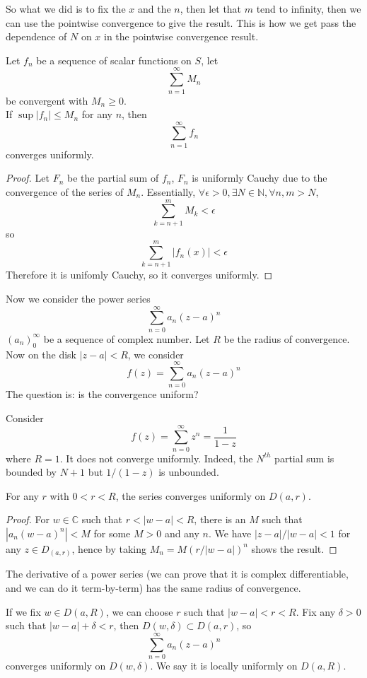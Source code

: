So what we did is to fix the $x$ and the $n$, then let that $m$ tend to infinity, then we can use the pointwise convergence to give the result.
This is how we get pass the dependence of $N$ on $x$ in the pointwise convergence result.
\begin{corollary}
    Let $f_n$ be a sequence of scalar functions on $S$, let
    $$\sum_{n=1}^\infty M_n$$
    be convergent with $M_n\ge 0$.\\
    If $\sup |f_n|\le M_n$ for any $n$, then
    $$\sum_{n=1}^\infty f_n$$
    converges uniformly.
\end{corollary}
\begin{proof}
    Let $F_n$ be the partial sum of $f_n$, $F_n$ is uniformly Cauchy due to the convergence of the series of $M_n$.
    Essentially, $\forall\epsilon>0,\exists N\in\mathbb N,\forall n,m>N$,
    $$\sum_{k=n+1}^mM_k<\epsilon$$
    so
    $$\sum_{k=n+1}^m|f_n(x)|<\epsilon$$
    Therefore it is unifomly Cauchy, so it converges uniformly.
\end{proof}
Now we consider the power series
$$\sum_{n=0}^\infty a_n(z-a)^n$$
$(a_n)_0^\infty$ be a sequence of complex number.
Let $R$ be the radius of convergence.
Now on the disk $|z-a|<R$, we consider
$$f(z)=\sum_{n=0}^\infty a_n(z-a)^n$$
The question is: is the convergence uniform?
\begin{example}
    Consider
    $$f(z)=\sum_{n=0}^\infty z^n=\frac{1}{1-z}$$
    where $R=1$.
    It does not converge uniformly.
    Indeed, the $N^{th}$ partial sum is bounded by $N+1$ but $1/(1-z)$ is unbounded.
\end{example}
\begin{theorem}
    For any $r$ with $0<r<R$, the series converges uniformly on $D(a,r)$.
\end{theorem}
\begin{proof}
    For $w\in\mathbb C$ such that $r<|w-a|<R$, there is an $M$ such that $|a_n(w-a)^n|<M$ for some $M>0$ and any $n$.
    We have $|z-a|/|w-a|<1$ for any $z\in D_(a,r)$, hence by taking $M_n=M(r/|w-a|)^n$ shows the result.
\end{proof}
The derivative of a power series (we can prove that it is complex differentiable, and we can do it term-by-term) has the same radius of convergence.
\begin{remark}
    If we fix $w\in D(a,R)$, we can choose $r$ such that $|w-a|<r<R$.
    Fix any $\delta>0$ such that $|w-a|+\delta<r$, then $D(w,\delta)\subset D(a,r)$, so
    $$\sum_{n=0}^\infty a_n(z-a)^n$$
    converges uniformly on $D(w,\delta)$.
    We say it is locally uniformly on $D(a,R)$.
\end{remark}